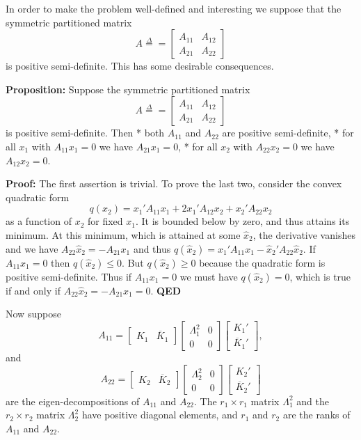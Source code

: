 \documentclass[
  12pt,
]{book}
\begin{document}
In order to make the problem well-defined and interesting we suppose that the symmetric partitioned matrix
\[
A\mathop{=}\limits^{\Delta}=\begin{bmatrix}A_{11}&A_{12}\\A_{21}&A_{22}\end{bmatrix}
\]
is positive semi-definite. This has some desirable consequences.

\textbf{Proposition:} Suppose the symmetric partitioned matrix
\[
A\mathop{=}\limits^{\Delta}=\begin{bmatrix}A_{11}&A_{12}\\A_{21}&A_{22}\end{bmatrix}
\]
is positive semi-definite. Then
* both \(A_{11}\) and \(A_{22}\) are positive semi-definite,
* for all \(x_1\) with \(A_{11}x_1=0\) we have \(A_{21}x_1=0\),
* for all \(x_2\) with \(A_{22}x_2=0\) we have \(A_{12}x_2=0\).

\textbf{Proof:} The first assertion is trivial. To prove the last two, consider the convex quadratic form
\[
q(x_2)=x_1'A_{11}x_1+2x_1'A_{12}x_2+x_2'A_{22}x_2
\]
as a function of \(x_2\) for fixed \(x_1\). It is bounded below by zero, and thus attains its minimum. At this minimum, which is attained at some \(\hat x_2\), the derivative vanishes and we have \(A_{22}\hat x_2=-A_{21}x_1\) and thus \(q(\hat x_2)=x_1'A_{11}x_1-\hat x_2'A_{22}\hat x_2.\)
If \(A_{11}x_1=0\) then \(q(\hat x_2)\leq 0\). But \(q(\hat x_2)\geq 0\) because the quadratic form is positive semi-definite. Thus if \(A_{11}x_1=0\) we must have \(q(\hat x_2)=0\), which is true if and only if \(A_{22}\hat x_2=-A_{21}x_1=0\).
\textbf{QED}

Now suppose
\[
A_{11}=\begin{bmatrix}K_1&\overline{K}_1\end{bmatrix}
\begin{bmatrix}\Lambda_1^2&0\\0&0\end{bmatrix}
\begin{bmatrix}K_1'\\\overline{K}_1'\end{bmatrix},
\]
and
\[
A_{22}=\begin{bmatrix}K_2&\overline{K}_2\end{bmatrix}
\begin{bmatrix}\Lambda_2^2&0\\0&0\end{bmatrix}
\begin{bmatrix}K_2'\\\overline{K}_2'\end{bmatrix}
\]
are the eigen-decompositions of \(A_{11}\) and \(A_{22}\). The \(r_1\times r_1\)
matrix \(\Lambda_1^2\) and the \(r_2\times r_2\) matrix \(\Lambda_2^2\) have positive diagonal elements, and \(r_1\) and \(r_2\) are the ranks of \(A_{11}\) and \(A_{22}\).
\end{document}
